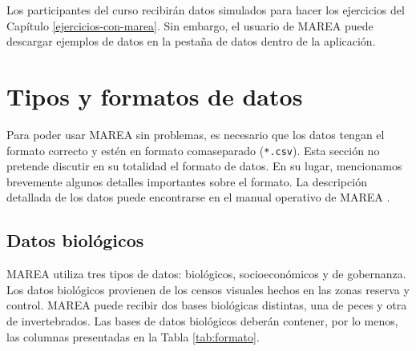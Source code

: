 \documentclass[]{krantz}
\begin{document}
Los participantes del curso recibirán datos simulados para hacer los ejercicios del Capítulo \ref{ejercicios-con-marea}. Sin embargo, el usuario de MAREA puede descargar ejemplos de datos en la pestaña de datos dentro de la aplicación.

\hypertarget{tipos-y-formatos-de-datos}{%
\section{Tipos y formatos de datos}\label{tipos-y-formatos-de-datos}}

Para poder usar MAREA sin problemas, es necesario que los datos tengan el formato correcto y estén en formato comaseparado (\texttt{*.csv}). Esta sección no pretende discutir en su totalidad el formato de datos. En su lugar, mencionamos brevemente algunos detalles importantes sobre el formato. La descripción detallada de los datos puede encontrarse en el manual operativo de MAREA \citep{villaseorderbez_2017}.

\hypertarget{datos-biologicos}{%
\subsection{Datos biológicos}\label{datos-biologicos}}

MAREA utiliza tres tipos de datos: biológicos, socioeconómicos y de gobernanza. Los datos biológicos provienen de los censos visuales hechos en las zonas reserva y control. MAREA puede recibir dos bases biológicas distintas, una de peces y otra de invertebrados. Las bases de datos biológicos deberán contener, por lo menos, las columnas presentadas en la Tabla \ref{tab:formato}.
\end{document}
